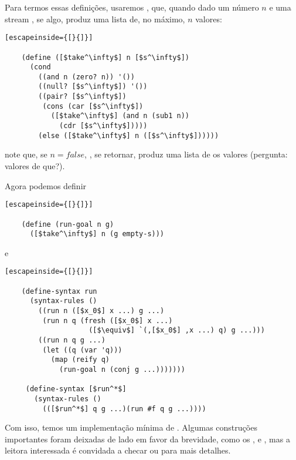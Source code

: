 \documentclass{article}
\begin{document}
  Para termos essas definições, usaremos ,
  que, quando dado um número $n$ e uma stream , se
  algo, produz uma lista de, no máximo, $n$ valores:

  \begin{lstlisting}[escapeinside={[}{]}]

    (define ([$take^\infty$] n [$s^\infty$])
      (cond
        ((and n (zero? n)) '())
        ((null? [$s^\infty$]) '())
        ((pair? [$s^\infty$])
         (cons (car [$s^\infty$])
           ([$take^\infty$] (and n (sub1 n))
             (cdr [$s^\infty$]))))
        (else ([$take^\infty$] n ([$s^\infty$])))))

  \end{lstlisting}

  \noindent note que, se $n = false$, , se
  retornar, produz uma lista de  os valores (pergunta:
  valores de que?).

  Agora podemos definir

  \begin{lstlisting}[escapeinside={[}{]}]

    (define (run-goal n g)
      ([$take^\infty$] n (g empty-s)))

  \end{lstlisting}

  \noindent e

  \begin{lstlisting}[escapeinside={[}{]}]

    (define-syntax run
      (syntax-rules ()
        ((run n ([$x_0$] x ...) g ...)
         (run n q (fresh ([$x_0$] x ...)
                    ([$\equiv$] `(,[$x_0$] ,x ...) q) g ...)))
        ((run n q g ...)
         (let ((q (var 'q)))
           (map (reify q)
             (run-goal n (conj g ...)))))))

     (define-syntax [$run^*$]
       (syntax-rules ()
         (([$run^*$] q g ...)(run #f q g ...))))

  \end{lstlisting}

  Com isso, temos um implementação mínima de
  . Algumas construções importantes foram
  deixadas de lado em favor da brevidade, como os
  ,  e ,
  mas a leitora interessada é convidada a checar \cite{will} ou
  \cite{kanren} para mais detalhes.
  
  
\end{document}
